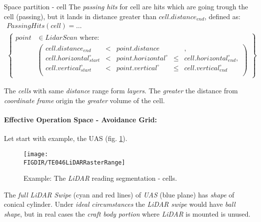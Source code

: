 \begin{definition}{Space partition - cell}
    \noindent The \emph{passing hits} for cell are hits which are going trough the cell (passing), but it lands in distance greater than $cell.distance_{end}$, defined as:
    \begin{multline}\label{eq:passingHitsCell}
        Passing Hits(cell)=
        \dots\\
            \left \{
                \begin{aligned}
                point& \in Lidar Scan \text{ where}:\\
                    &\left(\begin{aligned}
                        cell.distance_{end}&<& point.distance &&,\\
                        cell.horizontal^\circ_{start} &<& point.horizontal^\circ &\le&  cell.horizontal^\circ_{end},\\
                        cell.vertical^\circ_{start} &<& point.vertical^\circ &\le& cell.vertical^\circ_{end}\\
                    \end{aligned}\right)
                \end{aligned}
            \right\}
    \end{multline}
\end{definition}

\begin{note}
    The \emph{cells} with same \emph{distance} range form \emph{layers}. The \emph{greater} the distance from \emph{coordinate frame} origin the \emph{greater} volume of the cell.     
\end{note}

\paragraph{Effective Operation Space - Avoidance Grid:} Let start with example, the UAS  (fig. \ref{fig:LidarSpaceSegmentation}). 

\begin{figure}[H]
    \centering
    \texttt{[image: \\FIGDIR/TE046LiDARRasterRange]} 
    \caption{Example: The \emph{LiDAR} reading segmentation - cells.}
    \label{fig:LidarSpaceSegmentation}
\end{figure}

The \emph{full LiDAR Swipe} (cyan and red lines) of \emph{UAS} (blue plane) has \emph{shape} of conical cylinder. Under \emph{ideal circumstances} the \emph{LiDAR swipe} would have \emph{ball shape}, but in real cases the \emph{craft body portion} where \emph{LiDAR} is mounted is unused.


